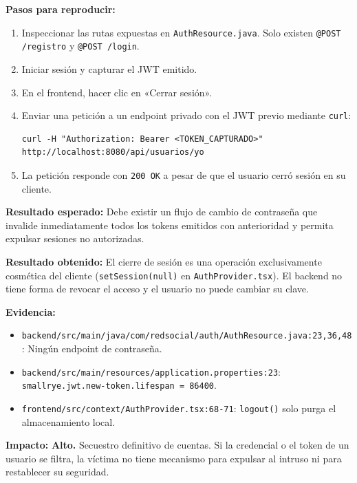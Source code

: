 \documentclass[10pt,a4paper]{article}
\newcommand{\code}[1]{\nolinkurl{#1}}
\begin{document}
\noindent\textbf{Pasos para reproducir:}
\begin{enumerate}[leftmargin=*]
    \item Inspeccionar las rutas expuestas en \code{AuthResource.java}. Solo existen \code{@POST /registro} y \code{@POST /login}.
    \item Iniciar sesión y capturar el JWT emitido.
    \item En el frontend, hacer clic en «Cerrar sesión».
    \item Enviar una petición a un endpoint privado con el JWT previo mediante \code{curl}:
    \begin{tcolorbox}[colback=codebg,colframe=gray!40,arc=1mm]\small
\begin{verbatim}
curl -H "Authorization: Bearer <TOKEN_CAPTURADO>" http://localhost:8080/api/usuarios/yo
\end{verbatim}
    \end{tcolorbox}
    \item La petición responde con \code{200 OK} a pesar de que el usuario cerró sesión en su cliente.
\end{enumerate}

\noindent\textbf{Resultado esperado:}
Debe existir un flujo de cambio de contraseña que invalide inmediatamente todos los tokens emitidos con anterioridad y permita expulsar sesiones no autorizadas.

\noindent\textbf{Resultado obtenido:}
El cierre de sesión es una operación exclusivamente cosmética del cliente (\code{setSession(null)} en \code{AuthProvider.tsx}). El backend no tiene forma de revocar el acceso y el usuario no puede cambiar su clave.

\noindent\textbf{Evidencia:}
\begin{itemize}[leftmargin=*]
    \item \code{backend/src/main/java/com/redsocial/auth/AuthResource.java:23,36,48}: Ningún endpoint de contraseña.
    \item \code{backend/src/main/resources/application.properties:23}: \code{smallrye.jwt.new-token.lifespan = 86400}.
    \item \code{frontend/src/context/AuthProvider.tsx:68-71}: \code{logout()} solo purga el almacenamiento local.
\end{itemize}

\noindent\textbf{Impacto:}
\textbf{Alto.} Secuestro definitivo de cuentas. Si la credencial o el token de un usuario se filtra, la víctima no tiene mecanismo para expulsar al intruso ni para restablecer su seguridad.
\end{document}
